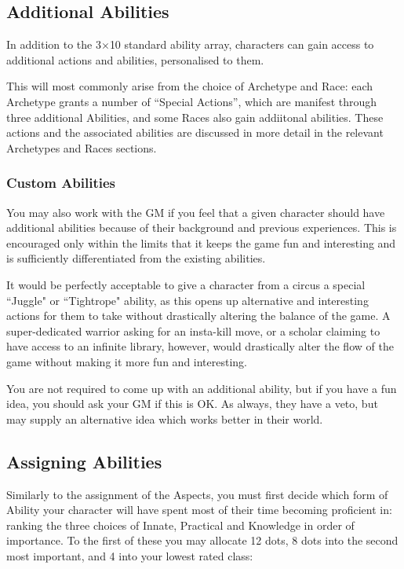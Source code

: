\subsection{Additional Abilities}

In addition to the 3$\times$10 standard ability array, characters can gain access to additional actions and abilities, personalised to them. 

This will most commonly arise from the choice of Archetype and Race: each Archetype grants a number of ``Special Actions'', which are manifest through three additional Abilities, and some Races also gain addiitonal abilities. These actions and the associated abilities are discussed in more detail in the relevant Archetypes and Races sections. 


\subsubsection{Custom Abilities}
You may also work with the GM if you feel that a given character should have additional abilities because of their background and previous experiences. This is encouraged only within the limits that it keeps the game fun and interesting and is sufficiently differentiated from the existing abilities.

It would be perfectly acceptable to give a character from a circus a special ``Juggle" or ``Tightrope" ability, as this opens up alternative and interesting actions for them to take without drastically altering the balance of the game. A super-dedicated warrior asking for an insta-kill move, or a scholar claiming to have access to an infinite library, however, would drastically alter the flow of the game without making it more fun and interesting. 

You are not required to come up with an additional ability, but if you have a fun idea, you should ask your GM if this is OK. As always, they have a veto, but may supply an alternative idea which works better in their world. 

\subsection{Assigning Abilities}

Similarly to the assignment of the Aspects, you must first decide which form of Ability your character will have spent most of their time becoming proficient in: ranking the three choices of Innate, Practical and Knowledge in order of importance. To the first of these you may allocate 12 dots, 8 dots into the second most important, and 4 into your lowest rated class:



